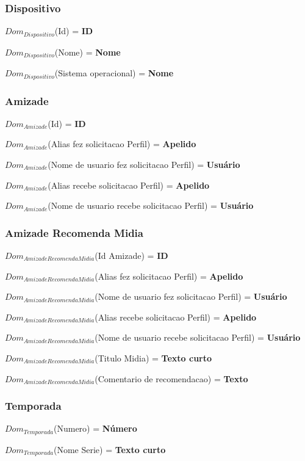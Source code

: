 \documentclass[12pt,a4paper]{article}
\newcommand{\createdomain}[3]{
    $Dom_{#1}$(#2) = {\bf #3}
}
\begin{document}
    \subsubsection{Dispositivo}
        \createdomain{Dispositivo}{Id}{ID}

        \createdomain{Dispositivo}{Nome}{Nome}

        \createdomain{Dispositivo}{Sistema operacional}{Nome}


    \subsubsection{Amizade}
        \createdomain{Amizade}{Id}{ID}

        \createdomain{Amizade}{Alias fez solicitacao Perfil}{Apelido}

        \createdomain{Amizade}{Nome de usuario fez solicitacao Perfil}{Usuário}

        \createdomain{Amizade}{Alias recebe solicitacao Perfil}{Apelido}

        \createdomain{Amizade}{Nome de usuario recebe solicitacao Perfil}{Usuário}


    \subsubsection{Amizade Recomenda Midia}
        \createdomain{Amizade Recomenda Midia}{Id Amizade}{ID}

        \createdomain{Amizade Recomenda Midia}{Alias fez solicitacao Perfil}{Apelido}

        \createdomain{Amizade Recomenda Midia}{Nome de usuario fez solicitacao Perfil}{Usuário}

        \createdomain{Amizade Recomenda Midia}{Alias recebe solicitacao Perfil}{Apelido}

        \createdomain{Amizade Recomenda Midia}{Nome de usuario recebe solicitacao Perfil}{Usuário}

        \createdomain{Amizade Recomenda Midia}{Titulo Midia}{Texto curto}

        \createdomain{Amizade Recomenda Midia}{Comentario de recomendacao}{Texto}


    \subsubsection{Temporada}
        \createdomain{Temporada}{Numero}{Número}

        \createdomain{Temporada}{Nome Serie}{Texto curto}
\end{document}
